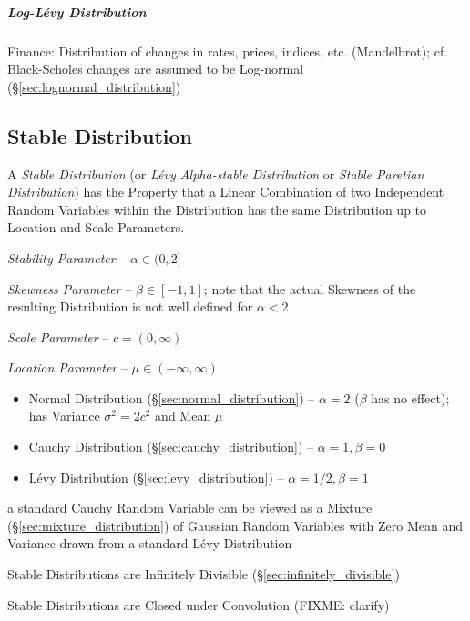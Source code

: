 \subparagraph{Log-L\'evy Distribution}\label{sec:log_levy}\hfill

Finance: Distribution of changes in rates, prices, indices, etc. (Mandelbrot);
cf. Black-Scholes changes are assumed to be Log-normal
(\S\ref{sec:lognormal_distribution})



\subsection{Stable Distribution}\label{sec:stable_distribution}

A \emph{Stable Distribution} (or \emph{L\'evy Alpha-stable Distribution} or
\emph{Stable Paretian Distribution}) has the Property that a Linear Combination
of two Independent Random Variables within the Distribution has the same
Distribution up to Location and Scale Parameters.

\emph{Stability Parameter} -- $\alpha \in (0, 2]$

\emph{Skewness Parameter} -- $\beta \in [-1, 1]$; note that the actual Skewness
of the resulting Distribution is not well defined for $\alpha < 2$

\emph{Scale Parameter} -- $c = (0, \infty)$

\emph{Location Parameter} -- $\mu \in (-\infty, \infty)$

\begin{itemize}
  \item Normal Distribution (\S\ref{sec:normal_distribution}) -- $\alpha = 2$
    ($\beta$ has no effect); has Variance $\sigma^2 = 2c^2$ and Mean $\mu$
  \item Cauchy Distribution (\S\ref{sec:cauchy_distribution}) --
    $\alpha = 1, \beta = 0$
  \item L\'evy Distribution (\S\ref{sec:levy_distribution}) --
    $\alpha = 1/2, \beta = 1$
\end{itemize}

a standard Cauchy Random Variable can be viewed as a Mixture
(\S\ref{sec:mixture_distribution}) of Gaussian Random Variables with Zero Mean
and Variance drawn from a standard L\'evy Distribution

Stable Distributions are Infinitely Divisible (\S\ref{sec:infinitely_divisible})

Stable Distributions are Closed under Convolution (FIXME: clarify)

